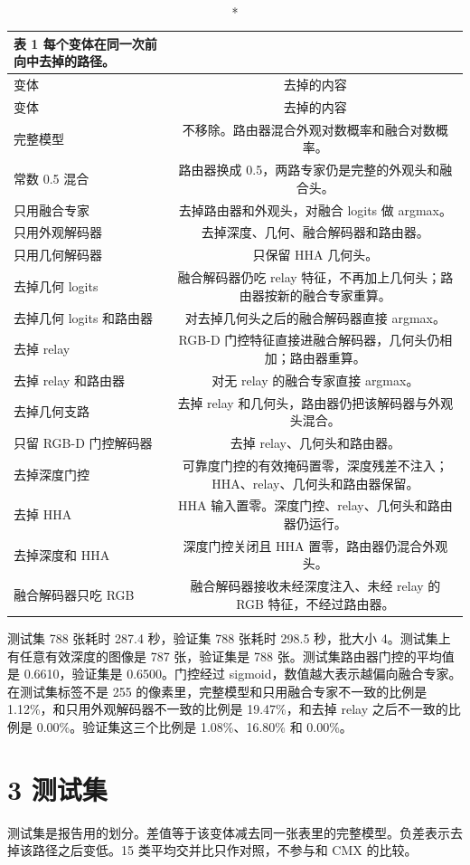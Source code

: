 \documentclass[11pt]{article}
\begin{document}
{\footnotesize\setlength{\tabcolsep}{3pt}
\begin{longtable}{p{4.2cm}c}
\caption*{表 1  每个变体在同一次前向中去掉的路径。}\\
\toprule
变体 & 去掉的内容\\
\midrule
\endfirsthead
\toprule
变体 & 去掉的内容\\
\midrule
\endhead
完整模型 & 不移除。路由器混合外观对数概率和融合对数概率。\\
常数 0.5 混合 & 路由器换成 0.5，两路专家仍是完整的外观头和融合头。\\
只用融合专家 & 去掉路由器和外观头，对融合 logits 做 argmax。\\
只用外观解码器 & 去掉深度、几何、融合解码器和路由器。\\
只用几何解码器 & 只保留 HHA 几何头。\\
去掉几何 logits & 融合解码器仍吃 relay 特征，不再加上几何头；路由器按新的融合专家重算。\\
去掉几何 logits 和路由器 & 对去掉几何头之后的融合解码器直接 argmax。\\
去掉 relay & RGB-D 门控特征直接进融合解码器，几何头仍相加；路由器重算。\\
去掉 relay 和路由器 & 对无 relay 的融合专家直接 argmax。\\
去掉几何支路 & 去掉 relay 和几何头，路由器仍把该解码器与外观头混合。\\
只留 RGB-D 门控解码器 & 去掉 relay、几何头和路由器。\\
去掉深度门控 & 可靠度门控的有效掩码置零，深度残差不注入；HHA、relay、几何头和路由器保留。\\
去掉 HHA & HHA 输入置零。深度门控、relay、几何头和路由器仍运行。\\
去掉深度和 HHA & 深度门控关闭且 HHA 置零，路由器仍混合外观头。\\
融合解码器只吃 RGB & 融合解码器接收未经深度注入、未经 relay 的 RGB 特征，不经过路由器。\\
\bottomrule
\end{longtable}
}
测试集 788 张耗时 287.4 秒，验证集 788 张耗时 298.5 秒，批大小 4。测试集上有任意有效深度的图像是 787 张，验证集是 788 张。测试集路由器门控的平均值是 0.6610，验证集是 0.6500。门控经过 sigmoid，数值越大表示越偏向融合专家。在测试集标签不是 255 的像素里，完整模型和只用融合专家不一致的比例是 1.12\%，和只用外观解码器不一致的比例是 19.47\%，和去掉 relay 之后不一致的比例是 0.00\%。验证集这三个比例是 1.08\%、16.80\% 和 0.00\%。

\section*{3  测试集}
测试集是报告用的划分。差值等于该变体减去同一张表里的完整模型。负差表示去掉该路径之后变低。15 类平均交并比只作对照，不参与和 CMX 的比较。
\end{document}
